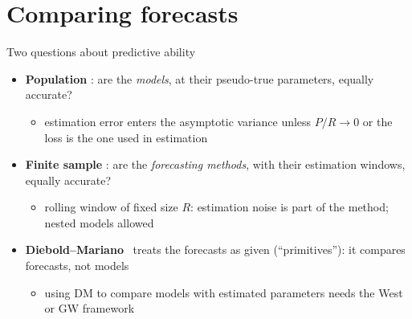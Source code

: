\section{Comparing forecasts}

\begin{frame}{Two questions about predictive ability}
\itemsize{\small}
\begin{itemize}
    \item \textbf{Population} : are the \emph{models}, at their pseudo-true parameters, equally accurate?
    \begin{itemize}
        \item estimation error enters the asymptotic variance unless $P/R \to 0$ or the loss is the one used in estimation
    \end{itemize}
    \item \textbf{Finite sample} : are the \emph{forecasting methods}, with their estimation windows, equally accurate?
    \begin{itemize}
        \item rolling window of fixed size $R$: estimation noise is part of the method; nested models allowed
    \end{itemize}
    \item \textbf{Diebold--Mariano} \ treats the forecasts as given (``primitives''): it compares forecasts, not models 
    \begin{itemize}
        \item using DM to compare models with estimated parameters needs the West or GW framework
    \end{itemize}
\end{itemize}
\end{frame}

